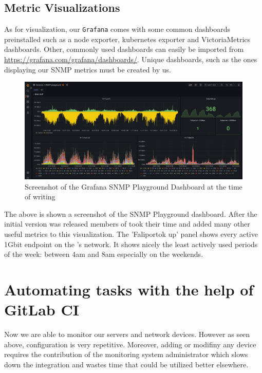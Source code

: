 \subsection{Metric Visualizations}

As for visualization, our \verb+Grafana+ comes with some common dashboards
preinstalled such as a node exporter, kubernetes exporter and VictoriaMetrics
dashboards. Other, commonly used dashboards can easily be imported from
\url{https://grafana.com/grafana/dashboards/}. Unique dashboards, such as the
ones displaying our SNMP metrics must be created by us.

\begin{figure}[!h]
	\centering
	\includegraphics[width=150mm, keepaspectratio]{figures/grafana-snmp-playground.png}
	\caption{Screenshot of the Grafana SNMP Playground Dashboard at the time of writing}
\end{figure}

The above is shown a screenshot of the SNMP Playground dashboard. After the
initial version was released members of \kszk took their time and added many
other useful metrics to this visualization. The 'Faliportok up' panel shows
every active 1Gbit endpoint on the \sch's network. It shows nicely the least
actively used periods of the week: between 4am and 8am especially on the
weekends.

\section{Automating tasks with the help of GitLab CI}

Now we are able to monitor our servers and network devices. However as seen
above, configuration is very repetitive. Moreover, adding or modifiny any
device requires the contribution of the monitoring system administrator which
slows down the integration and wastes time that could be utilized better
elsewhere.

